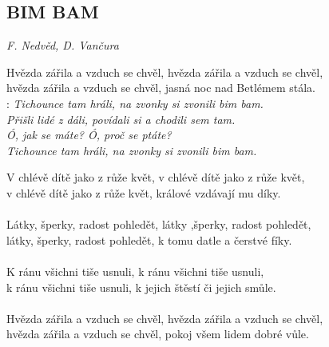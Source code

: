 \begin{flushleft}
	\section*{\Huge BIM BAM}
	\emph{F. Nedvěd, D. Vančura}
\end{flushleft}

Hvězda zářila a vzduch se chvěl, hvězda zářila a vzduch se chvěl,\\
hvězda zářila a vzduch se chvěl, jasná noc nad Betlémem stála.\\

\textregistered:
\emph{
Tichounce tam hráli, na zvonky si zvonili bim bam.\\
Přišli lidé z dáli, povídali si a chodili sem tam.\\
Ó, jak se máte? Ó, proč se ptáte?\\
Tichounce tam hráli, na zvonky si zvonili bim bam.\\
}

V chlévě dítě jako z růže květ, v chlévě dítě jako z růže květ,\\
v chlévě dítě jako z růže květ, králové vzdávají mu díky.\\
\\
Látky, šperky, radost pohledět, látky ,šperky, radost pohledět,\\
látky, šperky, radost pohledět, k tomu datle a čerstvé fíky.\\
\textregistered\\

K ránu všichni tiše usnuli, k ránu všichni tiše usnuli,\\
k ránu všichni tiše usnuli, k jejich štěstí či jejich smůle.\\
\\
Hvězda zářila a vzduch se chvěl, hvězda zářila a vzduch se chvěl,\\
hvězda zářila a vzduch se chvěl, pokoj všem lidem dobré vůle.\\
\textregistered

\newpage
